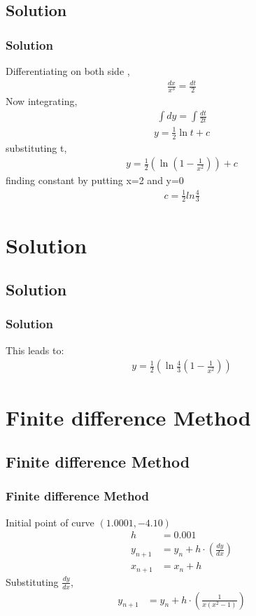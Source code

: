 \documentclass{beamer}
\providecommand{\brak}[1]{\ensuremath{\left(#1\right)}}
\theoremstyle{remark}
\numberwithin{equation}{section}
\begin{document}
\subsection{Solution}
\begin{frame}
\frametitle{Solution}
    Differentiating on both side ,
    \begin{align}
    \frac{dx}{x^3}=\frac{dt}{2}
    \end{align}
    Now integrating,
    \begin{align}
    \int{dy} = \int{\frac{dt}{2t}} 
    \end{align}
    \begin{align}
    y = \frac{1}{2}\ln{t} + c
    \end{align}
    substituting t,
    \begin{align}
    y = \frac{1}{2}\brak{\ln{\brak{1-\frac{1}{x^2}}}} + c
    \end{align} 
    finding constant by putting x=2 and y=0
    \begin{align}
    c = \frac{1}{2}ln{\frac{4}{3}}
    \end{align} 
    \end{frame}
    
    
    
\section{Solution}
\subsection{Solution}
\begin{frame}
\frametitle{Solution}
    This leads to:
    \begin{align}
    y = \frac{1}{2}\brak{\ln{\frac{4}{3}\brak{1-\frac{1}{x^2}}}}
    \end{align}
\end{frame}


\section{Finite difference Method}
\subsection{Finite difference Method}
\begin{frame}
\frametitle{Finite difference Method}
Initial point of curve \brak{1.0001,-4.10}
\begin{align} 
	h&=0.001 \\
	y_{n+1} &= y_{n} + h\cdot\brak{\frac{dy}{dx}} \\ 
	x_{n+1} &= x_{n} + h 
\end{align}
Substituting $\frac{dy}{dx}$,
\begin{align}
       y_{n+1} &= y_{n} + h\cdot\brak{\frac{1}{x(x^2-1)}}
\end{align}

\end{frame}
\end{document}
